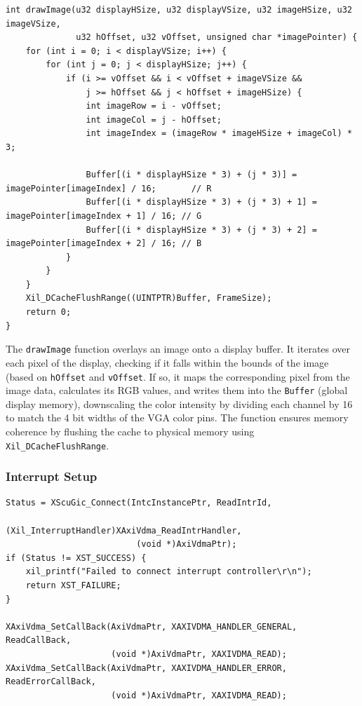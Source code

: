 \documentclass{article}
\begin{document}
\begin{verbatim}
int drawImage(u32 displayHSize, u32 displayVSize, u32 imageHSize, u32 imageVSize, 
              u32 hOffset, u32 vOffset, unsigned char *imagePointer) {
    for (int i = 0; i < displayVSize; i++) {
        for (int j = 0; j < displayHSize; j++) {
            if (i >= vOffset && i < vOffset + imageVSize && 
                j >= hOffset && j < hOffset + imageHSize) {
                int imageRow = i - vOffset;
                int imageCol = j - hOffset;
                int imageIndex = (imageRow * imageHSize + imageCol) * 3;

                Buffer[(i * displayHSize * 3) + (j * 3)] = imagePointer[imageIndex] / 16;       // R
                Buffer[(i * displayHSize * 3) + (j * 3) + 1] = imagePointer[imageIndex + 1] / 16; // G
                Buffer[(i * displayHSize * 3) + (j * 3) + 2] = imagePointer[imageIndex + 2] / 16; // B
            }
        }
    }
    Xil_DCacheFlushRange((UINTPTR)Buffer, FrameSize);
    return 0;
}
\end{verbatim}

The \verb|drawImage| function overlays an image onto a display buffer. It iterates over each pixel of the display, checking if it falls within the bounds of the image (based on \verb|hOffset| and \verb|vOffset|. If so, it maps the corresponding pixel from the image data, calculates its RGB values, and writes them into the \verb|Buffer| (global display memory), downscaling the color intensity by dividing each channel by 16 to match the 4 bit widths of the VGA color pins. The function ensures memory coherence by flushing the cache to physical memory using \verb|Xil_DCacheFlushRange|.

\subsubsection{Interrupt Setup}

\begin{verbatim}
Status = XScuGic_Connect(IntcInstancePtr, ReadIntrId, 
                          (Xil_InterruptHandler)XAxiVdma_ReadIntrHandler, 
                          (void *)AxiVdmaPtr);
if (Status != XST_SUCCESS) {
    xil_printf("Failed to connect interrupt controller\r\n");
    return XST_FAILURE;
}

XAxiVdma_SetCallBack(AxiVdmaPtr, XAXIVDMA_HANDLER_GENERAL, ReadCallBack, 
                     (void *)AxiVdmaPtr, XAXIVDMA_READ);
XAxiVdma_SetCallBack(AxiVdmaPtr, XAXIVDMA_HANDLER_ERROR, ReadErrorCallBack, 
                     (void *)AxiVdmaPtr, XAXIVDMA_READ);
\end{verbatim}
\end{document}
